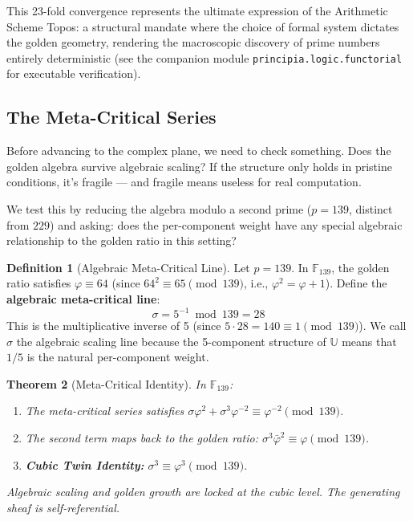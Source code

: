 \documentclass[12pt,oneside]{article}
\theoremstyle{principia}
\newtheorem{theorem}{Theorem}[section]
\theoremstyle{definition}
\newtheorem{definition}[theorem]{Definition}
\theoremstyle{remark}
\providecommand{\UU}{\mathbb{U}}
\providecommand{\FF}{\mathbb{F}}
\providecommand{\vp}{\varphi}
\providecommand{\vpbar}{\bar{\varphi}}
\begin{document}
This 23-fold convergence represents the ultimate expression of the Arithmetic Scheme Topos: a structural mandate where the choice of formal system dictates the golden geometry, rendering the macroscopic discovery of prime numbers entirely deterministic (see the companion module \texttt{principia.logic.functorial} for executable verification).

\subsection{The Meta-Critical Series}

Before advancing to the complex plane, we need to check something. Does the golden algebra survive algebraic scaling? If the structure only holds in pristine conditions, it's fragile --- and fragile means useless for real computation.

We test this by reducing the algebra modulo a second prime ($p = 139$, distinct from $229$) and asking: does the per-component weight have any special algebraic relationship to the golden ratio in this setting?

\begin{definition}[Algebraic Meta-Critical Line]\label{def:sigma}
Let $p = 139$. In $\FF_{139}$, the golden ratio satisfies $\vp \equiv 64$ (since $64^2 \equiv 65 \pmod{139}$, i.e., $\vp^2 = \vp + 1$). Define the \textbf{algebraic meta-critical line}:
$$\sigma = 5^{-1} \bmod{139} = 28$$
This is the multiplicative inverse of 5 (since $5 \cdot 28 = 140 \equiv 1 \pmod{139}$). We call $\sigma$ the algebraic scaling line because the 5-component structure of $\UU$ means that $1/5$ is the natural per-component weight.
\end{definition}

\begin{theorem}[Meta-Critical Identity]\label{thm:metacritical}
In $\FF_{139}$:
\begin{enumerate}
\item The meta-critical series satisfies $\sigma \vp^2 + \sigma^3 \vp^{-2} \equiv \vp^{-2} \pmod{139}$.
\item The second term maps back to the golden ratio: $\sigma^3 \vpbar^2 \equiv \vp \pmod{139}$.
\item \textbf{Cubic Twin Identity:} $\sigma^3 \equiv \vp^3 \pmod{139}$.
\end{enumerate}
Algebraic scaling and golden growth are locked at the cubic level. The generating sheaf is self-referential.
\end{theorem}
\end{document}
